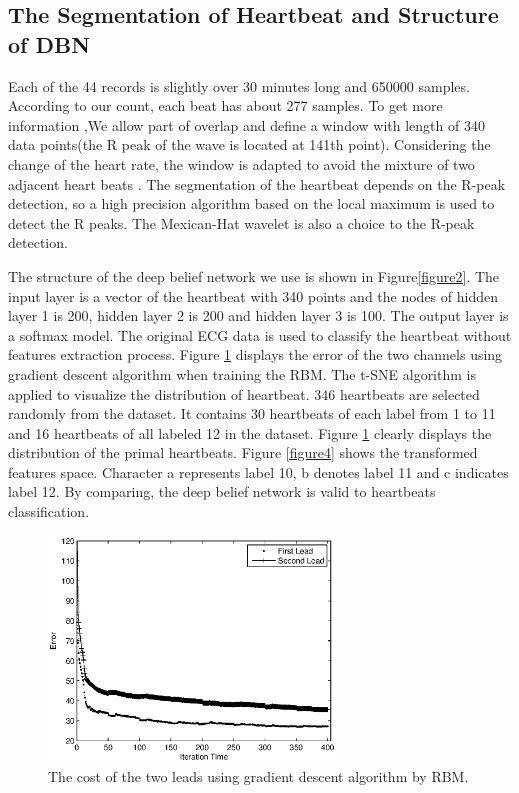 \documentclass[conference]{IEEEtran}
\begin{document}
\subsection{The Segmentation of Heartbeat and Structure of DBN}

Each of the 44 records is slightly over 30 minutes long and 650000 samples. According to our count, each beat has about 277 samples. To get more information ,We allow part of overlap and define a window with length of 340 data points(the R peak of the wave is
located at 141th point). Considering the change of the heart rate, the window is adapted to avoid the mixture of two adjacent heart beats \cite{Burke}. The segmentation of the heartbeat depends on the R-peak detection, so a high precision algorithm based on the local maximum is used to detect the R peaks. The Mexican-Hat wavelet \cite{Burke} is also a choice to the R-peak detection.

The structure of the deep belief network we use is shown in Figure\ref{figure2}. The input layer is a vector of the heartbeat with 340 points and the nodes of hidden layer 1 is 200, hidden layer 2 is 200 and hidden layer 3 is 100. The output layer is a softmax model. The original ECG data is used to classify the heartbeat without features extraction process. Figure \ref{figure3} displays the error of the two channels using gradient descent algorithm when training the RBM. The t-SNE \cite{Van} algorithm is applied to visualize the distribution of heartbeat. 346 heartbeats are selected randomly from the dataset. It contains 30 heartbeats of each label from 1 to 11 and 16 heartbeats of all labeled 12 in the dataset. Figure \ref{figure3} clearly displays the distribution of the primal heartbeats. Figure \ref{figure4} shows the transformed features space. Character a represents label 10, b denotes label 11 and c indicates label 12. By comparing, the deep belief network is valid to heartbeats classification.

\begin{figure}[htb]
\centering
\includegraphics[width=3in]{error.eps}
\caption{The cost of the two leads using gradient descent algorithm\cite{Leon} by RBM.}
\label{figure3}
\end{figure}
\end{document}
